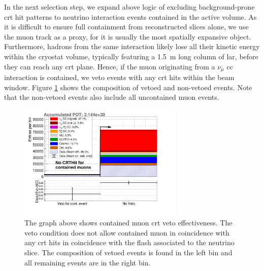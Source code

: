In the next selection step, we expand above logic of excluding background-prone \gls{crt} hit patterns to neutrino interaction events contained in the active volume. As it is difficult to ensure full containment from reconstructed slices alone, we use the muon track as a proxy, for it is usually the most spatially expansive object. Furthermore, hadrons from the same interaction likely lose all their kinetic energy within the cryostat volume, typically featuring a \SI{1.5}{\metre} long column of \gls{lar}, before they can reach any \gls{crt} plane. Hence, if the muon originating from a $\nu_{\mu}$ \gls{cc} interaction is contained, we veto events with any \gls{crt} hits within the beam window. Figure \ref{fig:no_CRThits_contained_3} shows the composition of vetoed and non-vetoed events. Note that the non-vetoed events also include all uncontained muon events.
\begin{figure}[htbp]
  \centering
  \includegraphics[width=0.7\textwidth]{images/NewCCInclusive/selection/No_CRThits_contained_3.pdf}
  \caption[CRT Veto on Contained Muons]{The graph above shows contained muon \gls{crt} veto effectiveness. The veto condition does not allow contained muon in coincidence with any \gls{crt} hits in coincidence with the flash associated to the neutrino slice. The composition of vetoed events is found in the left bin and all remaining events are in the right bin.}
  \label{fig:no_CRThits_contained_3}
\end{figure}

